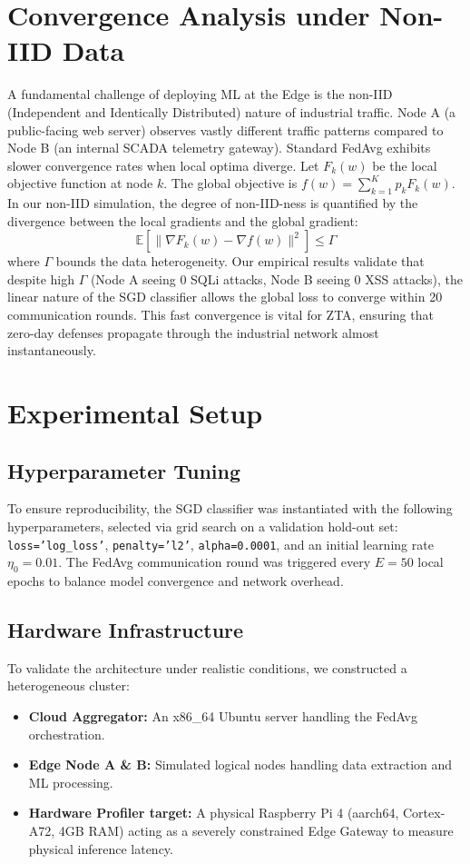 \documentclass[conference]{IEEEtran}
\begin{document}
\section{Convergence Analysis under Non-IID Data}
A fundamental challenge of deploying ML at the Edge is the non-IID (Independent and Identically Distributed) nature of industrial traffic. Node A (a public-facing web server) observes vastly different traffic patterns compared to Node B (an internal SCADA telemetry gateway).
Standard FedAvg exhibits slower convergence rates when local optima diverge. Let $F_k(w)$ be the local objective function at node $k$. The global objective is $f(w) = \sum_{k=1}^K p_k F_k(w)$. In our non-IID simulation, the degree of non-IID-ness is quantified by the divergence between the local gradients and the global gradient:
\begin{equation}
    \mathbb{E} [ \| \nabla F_k(w) - \nabla f(w) \|^2 ] \leq \Gamma
\end{equation}
where $\Gamma$ bounds the data heterogeneity. Our empirical results validate that despite high $\Gamma$ (Node A seeing 0 SQLi attacks, Node B seeing 0 XSS attacks), the linear nature of the SGD classifier allows the global loss to converge within 20 communication rounds. This fast convergence is vital for ZTA, ensuring that zero-day defenses propagate through the industrial network almost instantaneously.


\section{Experimental Setup}

\subsection{Hyperparameter Tuning}
To ensure reproducibility, the SGD classifier was instantiated with the following hyperparameters, selected via grid search on a validation hold-out set: \texttt{loss='log\_loss'}, \texttt{penalty='l2'}, \texttt{alpha=0.0001}, and an initial learning rate $\eta_0 = 0.01$. The FedAvg communication round was triggered every $E=50$ local epochs to balance model convergence and network overhead.

\subsection{Hardware Infrastructure}
To validate the architecture under realistic conditions, we constructed a heterogeneous cluster:
\begin{itemize}
    \item \textbf{Cloud Aggregator:} An x86\_64 Ubuntu server handling the FedAvg orchestration.
    \item \textbf{Edge Node A \& B:} Simulated logical nodes handling data extraction and ML processing.
    \item \textbf{Hardware Profiler target:} A physical Raspberry Pi 4 (aarch64, Cortex-A72, 4GB RAM) acting as a severely constrained Edge Gateway to measure physical inference latency.
\end{itemize}
\end{document}
